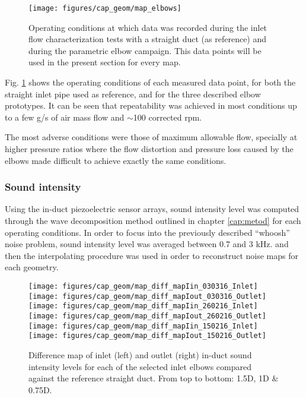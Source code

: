 \begin{figure}[bht!]
\centering
\texttt{[image: figures/cap\_geom/map\_elbows]}
\caption{Operating conditions at which data was recorded during the inlet flow characterization tests with a straight duct (as reference) and during the parametric elbow campaign. This data points will be used in the present section for every map.}
\label{fig:map_elbows}
\end{figure}

Fig. \ref{fig:map_elbows} shows the operating conditions of each measured data point, for both the straight inlet pipe used as reference, and for the three described elbow prototypes. It can be seen that repeatability was achieved in most conditions up to a few g/s of air mass flow and $\sim$100 corrected rpm. 

The most adverse conditions were those of maximum allowable flow, specially at higher pressure ratios where the flow distortion and pressure loss caused by the elbows made difficult to achieve exactly the same conditions.

\subsubsection{Sound intensity}

Using the in-duct piezoelectric sensor arrays, sound intensity level was computed through the wave decomposition method outlined in chapter \ref{cap:metod} for each operating conditions. In order to focus into the previously described ``whoosh'' noise problem, sound intensity level was averaged between 0.7 and 3 kHz. and then the interpolating procedure was used in order to reconstruct noise maps for each geometry.

\begin{figure}[thb!]
\centering

\texttt{[image: figures/cap\_geom/map\_diff\_mapIin\_030316\_Inlet]}\hspace{4mm}
\texttt{[image: figures/cap\_geom/map\_diff\_mapIout\_030316\_Outlet]}\\[4mm]

\texttt{[image: figures/cap\_geom/map\_diff\_mapIin\_260216\_Inlet]}\hspace{4mm}
\texttt{[image: figures/cap\_geom/map\_diff\_mapIout\_260216\_Outlet]}\\[4mm]

\texttt{[image: figures/cap\_geom/map\_diff\_mapIin\_150216\_Inlet]}\hspace{4mm}
\texttt{[image: figures/cap\_geom/map\_diff\_mapIout\_150216\_Outlet]}\\[4mm]

\caption{Difference map of inlet (left) and outlet (right) in-duct sound intensity levels for each of the selected inlet elbows compared against the reference straight duct. From top to bottom: 1.5D, 1D \& 0.75D.}
\label{fig:map_diff_in_out}
\end{figure}

